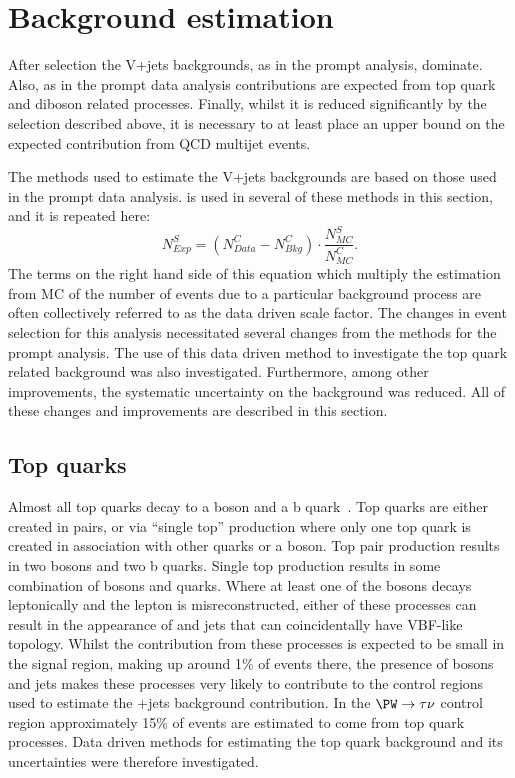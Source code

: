 \section{Background estimation}%
\label{sec:parkedbkg}
After selection the V+jets backgrounds, as in the prompt analysis, dominate. Also, as in the prompt data analysis contributions are expected from top quark and diboson related processes. Finally, whilst it is reduced significantly by the selection described above, it is necessary to at least place an upper bound on the expected contribution from \ac{QCD} multijet events.

The methods used to estimate the V+jets backgrounds are based on those used in the prompt data analysis.  is used in several of these methods in this section, and it is repeated here:
\begin{equation}
  \label{eq:wdatabkgrep}
  N^{S}_{Exp}=\left(N^{C}_{Data}-N^{C}_{Bkg}\right)\cdot\frac{N^{S}_{MC}}{N^{C}_{MC}}.
\end{equation}
The terms on the right hand side of this equation which multiply the estimation from \ac{MC} of the number of events due to a particular background process are often collectively referred to as the data driven scale factor. The changes in event selection for this analysis necessitated several changes from the methods for the prompt analysis. The use of this data driven method to investigate the top quark related background was also investigated. Furthermore, among other improvements, the systematic uncertainty on the \Znunu background was reduced. All of these changes and improvements are described in this section.

\subsection{Top quarks}
\label{sec:parkedtop}
Almost all top quarks decay to a \PW boson and a b quark~\cite{pdg}. Top quarks are either created in pairs, or via ``single top'' production where only one top quark is created in association with  other quarks or a \PW boson. Top pair production results in two \PW bosons and two b quarks. Single top production results in some combination of \PW bosons and quarks. Where at least one of the \PW bosons decays leptonically and the lepton is misreconstructed, either of these processes can result in the appearance of \MET and jets that can coincidentally have \ac{VBF}-like topology. Whilst the contribution from these processes is expected to be small in the signal region, making up around 1\% of events there, the presence of \PW bosons and jets makes these processes very likely to contribute to the control regions used to estimate the \PW+jets background contribution. In the $\PW\rightarrow\tau\nu$ control region approximately 15\% of events are estimated to come from top quark processes. Data driven methods for estimating the top quark background and its uncertainties were therefore investigated.

